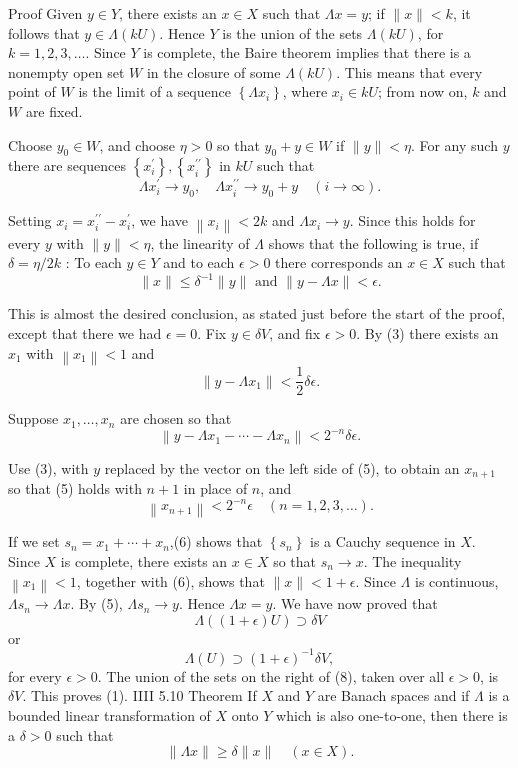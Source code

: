 Proof Given $y \in Y$, there exists an $x \in X$ such that $\Lambda x=y$; if $\|x\|<k$, it follows that $y \in \Lambda(k U)$. Hence $Y$ is the union of the sets $\Lambda(k U)$, for $k=1,2,3, \ldots$. Since $Y$ is complete, the Baire theorem implies that there is a nonempty open set $W$ in the closure of some $\Lambda(k U)$. This means that every point of $W$ is the limit of a sequence $\left\{\Lambda x_i\right\}$, where $x_i \in k U$; from now on, $k$ and $W$ are fixed.

Choose $y_0 \in W$, and choose $\eta>0$ so that $y_0+y \in W$ if $\|y\|<\eta$. For any such $y$ there are sequences $\left\{x_i^{\prime}\right\},\left\{x_i^{\prime \prime}\right\}$ in $k U$ such that
$$
\Lambda x_i^{\prime} \rightarrow y_0, \quad \Lambda x_i^{\prime \prime} \rightarrow y_0+y \quad(i \rightarrow \infty) .
$$

Setting $x_i=x_i^{\prime \prime}-x_i^{\prime}$, we have $\left\|x_i\right\|<2 k$ and $\Lambda x_i \rightarrow y$. Since this holds for every $y$ with $\|y\|<\eta$, the linearity of $\Lambda$ shows that the following is true, if $\delta=\eta / 2 k$ :
To each $y \in Y$ and to each $\epsilon>0$ there corresponds an $x \in X$ such that
$$
\|x\| \leq \delta^{-1}\|y\| \text { and }\|y-\Lambda x\|<\epsilon .
$$

This is almost the desired conclusion, as stated just before the start of the proof, except that there we had $\epsilon=0$.
Fix $y \in \delta V$, and fix $\epsilon>0$. By (3) there exists an $x_1$ with $\left\|x_1\right\|<1$ and
$$
\left\|y-\Lambda x_1\right\|<\frac{1}{2} \delta \epsilon .
$$

Suppose $x_1, \ldots, x_n$ are chosen so that
$$
\left\|y-\Lambda x_1-\cdots-\Lambda x_n\right\|<2^{-n} \delta \epsilon .
$$

Use (3), with $y$ replaced by the vector on the left side of (5), to obtain an $x_{n+1}$ so that (5) holds with $n+1$ in place of $n$, and
$$
\left\|x_{n+1}\right\|<2^{-n} \epsilon \quad(n=1,2,3, \ldots) .
$$

If we set $s_n=x_1+\cdots+x_n$,(6) shows that $\left\{s_n\right\}$ is a Cauchy sequence in $X$. Since $X$ is complete, there exists an $x \in X$ so that $s_n \rightarrow x$. The inequality $\left\|x_1\right\|<1$, together with (6), shows that $\|x\|<1+\epsilon$. Since $\Lambda$ is continuous, $\Lambda s_n \rightarrow \Lambda x$. By (5), $\Lambda s_n \rightarrow y$. Hence $\Lambda x=y$.
We have now proved that
$$
\Lambda((1+\epsilon) U) \supset \delta V
$$
or
$$
\Lambda(U) \supset(1+\epsilon)^{-1} \delta V,
$$
for every $\epsilon>0$. The union of the sets on the right of (8), taken over all $\epsilon>0$, is $\delta V$. This proves (1).
IIII
5.10 Theorem If $X$ and $Y$ are Banach spaces and if $\Lambda$ is a bounded linear transformation of $X$ onto $Y$ which is also one-to-one, then there is a $\delta>0$ such that
$$
\|\Lambda x\| \geq \delta\|x\| \quad(x \in X) .
$$

